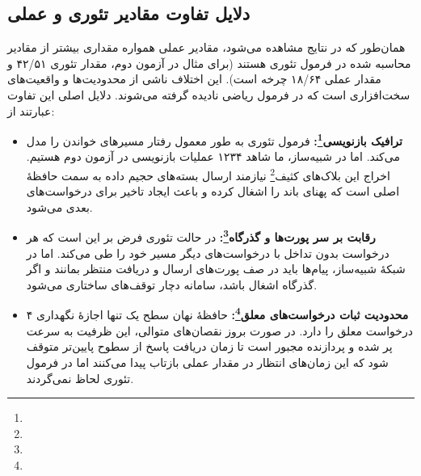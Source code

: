 \subsection{دلایل تفاوت مقادیر تئوری و عملی}
همان‌طور که در نتایج مشاهده می‌شود، مقادیر عملی همواره مقداری بیشتر از مقادیر محاسبه شده در فرمول تئوری هستند (برای مثال در آزمون دوم، مقدار تئوری ۴۲/۵۱ و مقدار عملی ۱۸/۶۴ چرخه است). این اختلاف ناشی از محدودیت‌ها و واقعیت‌های سخت‌افزاری است که در فرمول ریاضی نادیده گرفته می‌شوند. دلایل اصلی این تفاوت عبارتند از:
\begin{itemize}
	\item \textbf{ترافیک بازنویسی\footnote{}:} فرمول تئوری به طور معمول رفتار مسیرهای خواندن را مدل می‌کند. اما در شبیه‌ساز، ما شاهد ۱۲۳۴ عملیات بازنویسی در آزمون دوم هستیم. اخراج این بلاک‌های کثیف\footnote{} نیازمند ارسال بسته‌های حجیم داده به سمت حافظهٔ اصلی است که پهنای باند را اشغال کرده و باعث ایجاد تاخیر برای درخواست‌های بعدی می‌شود.
	\item \textbf{رقابت بر سر پورت‌ها و گذرگاه\footnote{}:} در حالت تئوری فرض بر این است که هر درخواست بدون تداخل با درخواست‌های دیگر مسیر خود را طی می‌کند. اما در شبکهٔ شبیه‌ساز، پیام‌ها باید در صف پورت‌های ارسال و دریافت منتظر بمانند و اگر گذرگاه اشغال باشد، سامانه دچار توقف‌های ساختاری می‌شود.
	\item \textbf{محدودیت ثبات درخواست‌های معلق\footnote{}:} حافظهٔ نهان سطح یک تنها اجازهٔ نگهداری ۴ درخواست معلق را دارد. در صورت بروز نقصان‌های متوالی، این ظرفیت به سرعت پر شده و پردازنده مجبور است تا زمان دریافت پاسخ از سطوح پایین‌تر متوقف شود که این زمان‌های انتظار در مقدار عملی بازتاب پیدا می‌کنند اما در فرمول تئوری لحاظ نمی‌گردند.
\end{itemize}